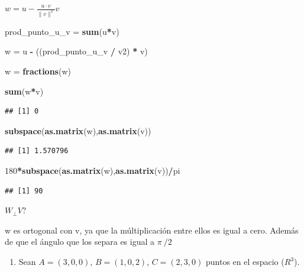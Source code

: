 \documentclass[]{article}
\newenvironment{Shaded}{\begin{snugshade}}{\end{snugshade}}
\newcommand{\DecValTok}[1]{\textcolor[rgb]{0.00,0.00,0.81}{#1}}
\newcommand{\KeywordTok}[1]{\textcolor[rgb]{0.13,0.29,0.53}{\textbf{#1}}}
\newcommand{\NormalTok}[1]{#1}
\newcommand{\OperatorTok}[1]{\textcolor[rgb]{0.81,0.36,0.00}{\textbf{#1}}}
\newcommand{\StringTok}[1]{\textcolor[rgb]{0.31,0.60,0.02}{#1}}
\providecommand{\tightlist}{%
  \setlength{\itemsep}{0pt}\setlength{\parskip}{0pt}}
\begin{document}
\(w = u - \frac{u \cdot v}{\|v\|^2} v\)

\begin{Shaded}
\begin{Highlighting}[]
\NormalTok{prod_punto_u_v =}\StringTok{ }\KeywordTok{sum}\NormalTok{(u}\OperatorTok{*}\NormalTok{v)}

\NormalTok{w =}\StringTok{ }\NormalTok{u }\OperatorTok{-}\StringTok{ }\NormalTok{((prod_punto_u_v }\OperatorTok{/}\StringTok{ }\NormalTok{v2) }\OperatorTok{*}\StringTok{ }\NormalTok{v)}

\NormalTok{w =}\StringTok{ }\KeywordTok{fractions}\NormalTok{(w)}

\KeywordTok{sum}\NormalTok{(w}\OperatorTok{*}\NormalTok{v)}
\end{Highlighting}
\end{Shaded}

\begin{verbatim}
## [1] 0
\end{verbatim}

\begin{Shaded}
\begin{Highlighting}[]
\KeywordTok{subspace}\NormalTok{(}\KeywordTok{as.matrix}\NormalTok{(w),}\KeywordTok{as.matrix}\NormalTok{(v))}
\end{Highlighting}
\end{Shaded}

\begin{verbatim}
## [1] 1.570796
\end{verbatim}

\begin{Shaded}
\begin{Highlighting}[]
\DecValTok{180}\OperatorTok{*}\KeywordTok{subspace}\NormalTok{(}\KeywordTok{as.matrix}\NormalTok{(w),}\KeywordTok{as.matrix}\NormalTok{(v))}\OperatorTok{/}\NormalTok{pi}
\end{Highlighting}
\end{Shaded}

\begin{verbatim}
## [1] 90
\end{verbatim}

\(W _{\bot } V ?\)

w es ortogonal con v, ya que la múltiplicación entre ellos es igual a
cero. Además de que el ángulo que los separa es igual a \(\pi\ /2\)

\begin{enumerate}
\def\labelenumi{\arabic{enumi}.}
\setcounter{enumi}{2}
\tightlist
\item
  Sean \(A=(3,0,0)\), \(B=(1,0,2)\), \(C=(2,3,0)\) puntos en el espacio
  (\(R^3\)).
\end{enumerate}
\end{document}
